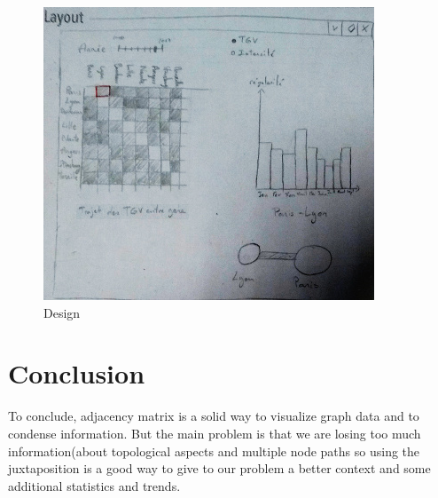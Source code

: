 \documentclass{vgtc}                          %
\begin{document}
\begin{figure}[h!]
 \includegraphics[width=\columnwidth]{first-layout}
 
 \caption{Design}
 \label{fig:sample}
\end{figure} 
\section{Conclusion}
To conclude, adjacency matrix is a solid way to visualize graph data and to condense information. But the main problem is that we are losing too much information(about topological aspects and multiple node paths \cite{Fekete} so using the juxtaposition is a good way to give to our problem a better context and some additional statistics and trends.



\end{document}
